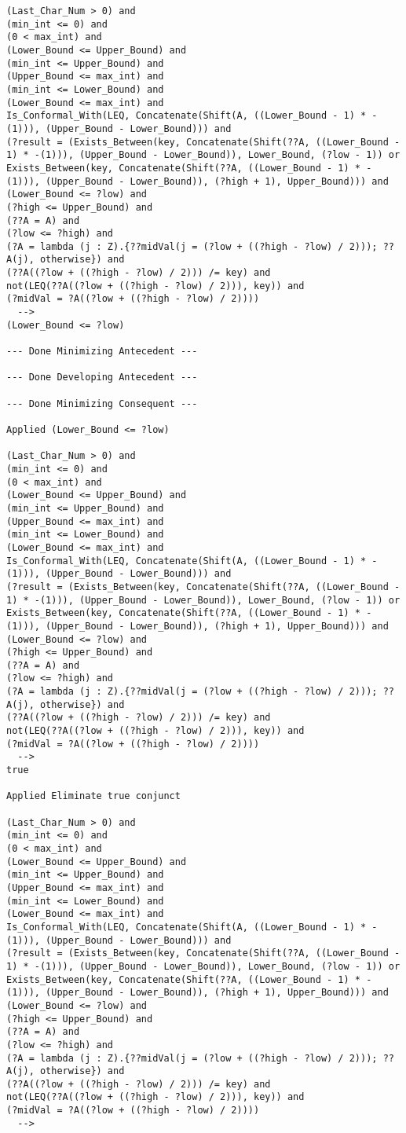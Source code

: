 \begin{lstlisting}[language=resolve]
(Last_Char_Num > 0) and
(min_int <= 0) and
(0 < max_int) and
(Lower_Bound <= Upper_Bound) and
(min_int <= Upper_Bound) and
(Upper_Bound <= max_int) and
(min_int <= Lower_Bound) and
(Lower_Bound <= max_int) and
Is_Conformal_With(LEQ, Concatenate(Shift(A, ((Lower_Bound - 1) * -(1))), (Upper_Bound - Lower_Bound))) and
(?result = (Exists_Between(key, Concatenate(Shift(??A, ((Lower_Bound - 1) * -(1))), (Upper_Bound - Lower_Bound)), Lower_Bound, (?low - 1)) or Exists_Between(key, Concatenate(Shift(??A, ((Lower_Bound - 1) * -(1))), (Upper_Bound - Lower_Bound)), (?high + 1), Upper_Bound))) and
(Lower_Bound <= ?low) and
(?high <= Upper_Bound) and
(??A = A) and
(?low <= ?high) and
(?A = lambda (j : Z).{??midVal(j = (?low + ((?high - ?low) / 2))); ??A(j), otherwise}) and
(??A((?low + ((?high - ?low) / 2))) /= key) and
not(LEQ(??A((?low + ((?high - ?low) / 2))), key)) and
(?midVal = ?A((?low + ((?high - ?low) / 2))))
  -->
(Lower_Bound <= ?low)

--- Done Minimizing Antecedent ---

--- Done Developing Antecedent ---

--- Done Minimizing Consequent ---

Applied (Lower_Bound <= ?low)

(Last_Char_Num > 0) and
(min_int <= 0) and
(0 < max_int) and
(Lower_Bound <= Upper_Bound) and
(min_int <= Upper_Bound) and
(Upper_Bound <= max_int) and
(min_int <= Lower_Bound) and
(Lower_Bound <= max_int) and
Is_Conformal_With(LEQ, Concatenate(Shift(A, ((Lower_Bound - 1) * -(1))), (Upper_Bound - Lower_Bound))) and
(?result = (Exists_Between(key, Concatenate(Shift(??A, ((Lower_Bound - 1) * -(1))), (Upper_Bound - Lower_Bound)), Lower_Bound, (?low - 1)) or Exists_Between(key, Concatenate(Shift(??A, ((Lower_Bound - 1) * -(1))), (Upper_Bound - Lower_Bound)), (?high + 1), Upper_Bound))) and
(Lower_Bound <= ?low) and
(?high <= Upper_Bound) and
(??A = A) and
(?low <= ?high) and
(?A = lambda (j : Z).{??midVal(j = (?low + ((?high - ?low) / 2))); ??A(j), otherwise}) and
(??A((?low + ((?high - ?low) / 2))) /= key) and
not(LEQ(??A((?low + ((?high - ?low) / 2))), key)) and
(?midVal = ?A((?low + ((?high - ?low) / 2))))
  -->
true

Applied Eliminate true conjunct

(Last_Char_Num > 0) and
(min_int <= 0) and
(0 < max_int) and
(Lower_Bound <= Upper_Bound) and
(min_int <= Upper_Bound) and
(Upper_Bound <= max_int) and
(min_int <= Lower_Bound) and
(Lower_Bound <= max_int) and
Is_Conformal_With(LEQ, Concatenate(Shift(A, ((Lower_Bound - 1) * -(1))), (Upper_Bound - Lower_Bound))) and
(?result = (Exists_Between(key, Concatenate(Shift(??A, ((Lower_Bound - 1) * -(1))), (Upper_Bound - Lower_Bound)), Lower_Bound, (?low - 1)) or Exists_Between(key, Concatenate(Shift(??A, ((Lower_Bound - 1) * -(1))), (Upper_Bound - Lower_Bound)), (?high + 1), Upper_Bound))) and
(Lower_Bound <= ?low) and
(?high <= Upper_Bound) and
(??A = A) and
(?low <= ?high) and
(?A = lambda (j : Z).{??midVal(j = (?low + ((?high - ?low) / 2))); ??A(j), otherwise}) and
(??A((?low + ((?high - ?low) / 2))) /= key) and
not(LEQ(??A((?low + ((?high - ?low) / 2))), key)) and
(?midVal = ?A((?low + ((?high - ?low) / 2))))
  -->



\end{lstlisting}
